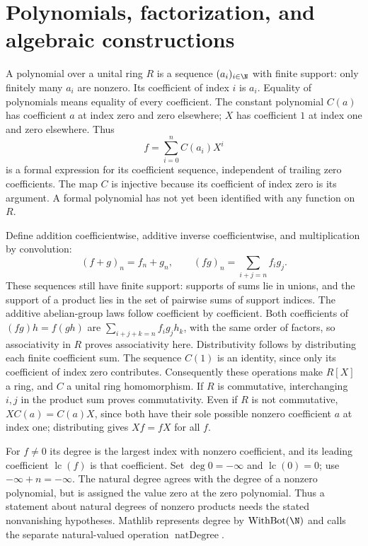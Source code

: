 \chapter{Polynomials, factorization, and algebraic constructions}\label{chap:M07.11}

A polynomial over a unital ring $R$ is a sequence $(a_i)_{i\in\N}$
with finite support: only finitely many $a_i$ are nonzero. Its
coefficient of index $i$ is $a_i$. Equality of polynomials means equality
of every coefficient. The constant polynomial $C(a)$ has coefficient
$a$ at index zero and zero elsewhere; $X$ has coefficient $1$ at index
one and zero elsewhere. Thus
\[
 f=\sum_{i=0}^n C(a_i)X^i
\]
is a formal expression for its coefficient sequence, independent of
trailing zero coefficients. The map $C$ is injective because its
coefficient of index zero is its argument. A formal polynomial has not
yet been identified with any function on $R$.

Define addition coefficientwise, additive inverse coefficientwise, and
multiplication by convolution:
\[
 (f+g)_n=f_n+g_n,\qquad (fg)_n=\sum_{i+j=n}f_i g_j.
\]
These sequences still have finite support: supports of sums lie in
unions, and the support of a product lies in the set of pairwise sums
of support indices. The additive abelian-group laws follow coefficient
by coefficient. Both coefficients of $(fg)h=f(gh)$ are
$\sum_{i+j+k=n}f_i g_j h_k$, with the same order of factors, so
associativity in $R$ proves associativity here. Distributivity follows
by distributing each finite coefficient sum. The sequence $C(1)$ is
an identity, since only its coefficient of index zero contributes.
Consequently these operations make $R[X]$ a ring, and $C$ a unital
ring homomorphism. If $R$ is commutative, interchanging $i,j$ in the
product sum proves commutativity. Even if $R$ is not commutative,
$X C(a)=C(a)X$, since both have their sole possible nonzero
coefficient $a$ at index one; distributing gives $Xf=fX$ for all $f$.

For $f\ne0$ its degree is the largest index with nonzero coefficient,
and its leading coefficient $\operatorname{lc}(f)$ is that coefficient.
Set $\deg0=-\infty$ and $\operatorname{lc}(0)=0$; use
$-\infty+n=-\infty$. The natural degree agrees with the degree of a
nonzero polynomial, but is assigned the value zero at the zero
polynomial. Thus a statement about natural degrees of nonzero products
needs the stated nonvanishing hypotheses. Mathlib represents degree by
$\operatorname{WithBot}(\N)$ and calls the separate natural-valued
operation $\operatorname{natDegree}$.

